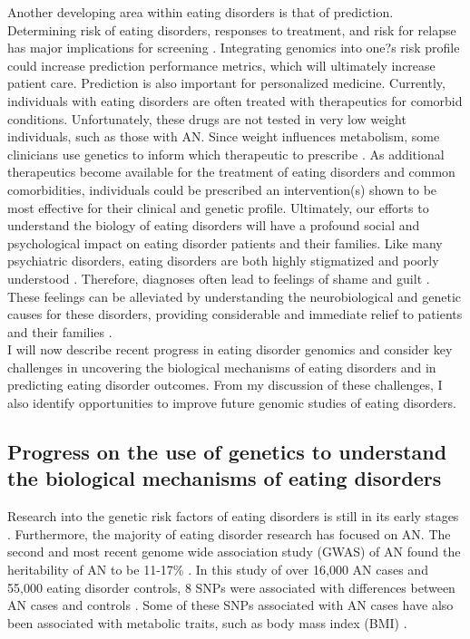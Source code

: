 Another developing area within eating disorders is that of prediction. Determining risk of eating disorders, responses to treatment, and risk for relapse has major implications for screening \cite{RN4543}. Integrating genomics into one?s risk profile could increase prediction performance metrics, which will ultimately increase patient care. Prediction is also important for personalized medicine. Currently, individuals with eating disorders are often treated with therapeutics for comorbid conditions. Unfortunately, these drugs are not tested in very low weight individuals, such as those with AN. Since weight influences metabolism, some clinicians use genetics to inform which therapeutic to prescribe \cite{RN4212}. As additional therapeutics become available for the treatment of eating disorders and common comorbidities, individuals could be prescribed an intervention(s) shown to be most effective for their clinical and genetic profile. 
	Ultimately, our efforts to understand the biology of eating disorders will have a profound social and psychological impact on eating disorder patients and their families. Like many psychiatric disorders, eating disorders are both highly stigmatized and poorly understood \cite{RN4212}. Therefore, diagnoses often lead to feelings of shame and guilt \cite{RN1089}. These feelings can be alleviated by understanding the neurobiological and genetic causes for these disorders, providing considerable and immediate relief to patients and their families \cite{RN4212}.
\\
I will now describe recent progress in eating disorder genomics and consider key challenges in uncovering the biological mechanisms of eating disorders and in predicting eating disorder outcomes. From my discussion of these challenges, I also identify opportunities to improve future genomic studies of eating disorders. 

\subsection{Progress on the use of genetics to understand the biological mechanisms of eating disorders}
Research into the genetic risk factors of eating disorders is still in its early stages \cite{RN4212}. Furthermore, the majority of eating disorder research has focused on AN. The second and most recent genome wide association study (GWAS) of AN found the heritability of AN to be 11-17\% \cite{RN4568}. In this study of over 16,000 AN cases and 55,000 eating disorder controls, 8 SNPs were associated with differences between AN cases and controls \cite{RN4568}. Some of these SNPs associated with AN cases have also been associated with metabolic traits, such as body mass index (BMI) \cite{RN4568}. 


